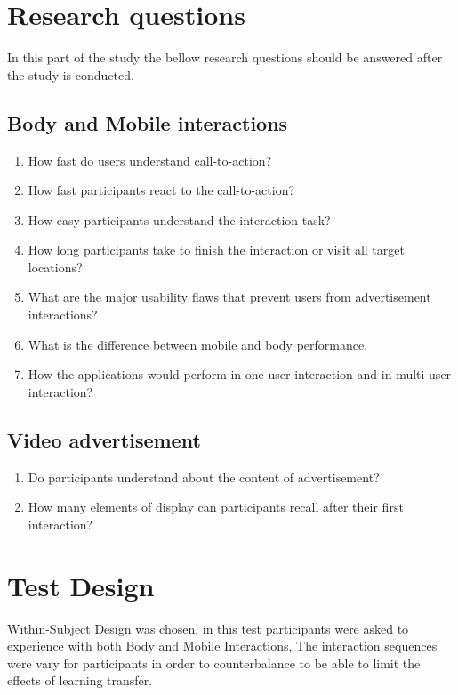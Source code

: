 \section{Research questions}

In this part of the study the bellow research questions should be answered after the study is conducted. 

\subsection{Body and Mobile interactions}
\begin{enumerate}
\item	How fast do users understand call-to-action?
\item	How fast participants react to the call-to-action?
\item	How easy participants understand the interaction task?
\item	How long participants take to finish the interaction or visit all target locations?
\item	What are the major usability flaws that prevent users from advertisement interactions?
\item	What is the difference between mobile and body performance.
\item   How the applications would perform in one user interaction and in multi user interaction?
\end{enumerate}

\subsection{Video advertisement}
\begin{enumerate}
\item	Do participants understand about the content of advertisement?
\item	How many elements of display can participants recall after their first interaction?
\end{enumerate}


\section{Test Design}
Within-Subject Design was chosen, in this test participants were asked to experience with both Body and Mobile Interactions, The interaction sequences were vary for participants in order to counterbalance to be able to limit the effects of learning transfer. 

